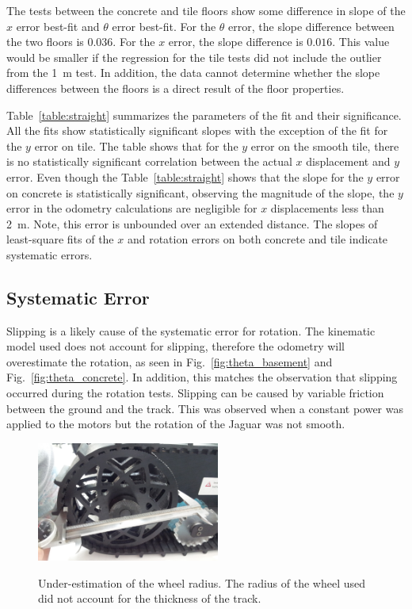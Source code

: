 \documentclass[conference]{../IEEEtran}
\begin{document}
The tests between the concrete and tile floors show some difference in slope of the $x$
error best-fit and $\theta$ error best-fit. For the $\theta$ error, the slope difference
between the two floors is $0.036$. For the $x$ error, the slope difference is $0.016$.
This value would be smaller if the regression for the tile tests did not include the
outlier from the \SI{1}{m} test. In addition, the data cannot determine whether the slope
differences between the floors is a direct result of the floor properties.

Table~\ref{table:straight} summarizes the parameters of the fit and their significance.
All the fits show statistically significant slopes with the exception of the fit for the
$y$ error on tile. The table shows that for the $y$ error on the smooth tile, there is no
statistically significant correlation between the actual $x$ displacement and $y$ error.
Even though the Table~\ref{table:straight} shows that the slope for the $y$ error on
concrete is statistically significant, observing the magnitude of the slope, the $y$ error
in the odometry calculations are negligible for $x$ displacements less than
\SI{2}{\meter}. Note, this error is unbounded over an extended distance. The slopes of
least-square fits of the $x$ and rotation errors on both concrete and tile indicate
systematic errors.

\subsection{Systematic Error}

Slipping is a likely cause of the systematic error for rotation. The kinematic model used
does not account for slipping, therefore the odometry will overestimate the rotation, as
seen in Fig.~\ref{fig:theta_basement} and Fig.~\ref{fig:theta_concrete}. In addition, this
matches the observation that slipping occurred during the rotation tests. Slipping can be
caused by variable friction between the ground and the track. This was observed when a
constant power was applied to the motors but the rotation of the Jaguar was not smooth.

\begin{figure}[t] \centering
  \includegraphics[width=6cm]{figures/wheel.jpg}
  \label{fig:wheel}
  \caption{Under-estimation of the wheel radius. The radius of the wheel
           used did not account for the thickness of the track.}
\end{figure}
\end{document}
